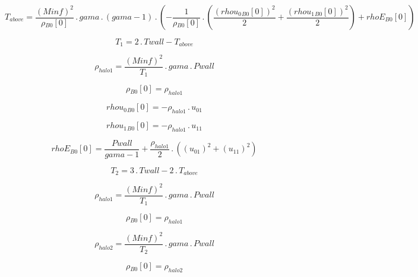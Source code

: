 \documentclass{article}
\begin{document}
\begin{dmath}T_{above} = \frac{\left(Minf \right)^{2}}{{\rho{_{B0}}}[{0}]} \,.\, gama \,.\, \left(gama - 1\right) \,.\, \left(- \frac{1}{{\rho{_{B0}}}[{0}]} \,.\, \left(\frac{\left({rhou_{0}{_{B0}}}[{0}] \right)^{2}}{2} + 
\frac{\left({rhou_{1}{_{B0}}}[{0}] \right)^{2}}{2}\right) + {rhoE{_{B0}}}[{0}]\right)\end{dmath}

\begin{dmath}T_{1} = 2 \,.\, Twall - T_{above}\end{dmath}

\begin{dmath}\rho_{halo 1} = \frac{\left(Minf \right)^{2}}{T_{1}} \,.\, gama \,.\, Pwall\end{dmath}

\begin{dmath}{\rho{_{B0}}}[{0}] = \rho_{halo 1}\end{dmath}

\begin{dmath}{rhou_{0}{_{B0}}}[{0}] = - \rho_{halo 1} \,.\, u_{01}\end{dmath}

\begin{dmath}{rhou_{1}{_{B0}}}[{0}] = - \rho_{halo 1} \,.\, u_{11}\end{dmath}

\begin{dmath}{rhoE{_{B0}}}[{0}] = \frac{Pwall}{gama - 1} + \frac{\rho_{halo 1}}{2} \,.\, \left(\left(u_{01} \right)^{2} + \left(u_{11} \right)^{2}\right)\end{dmath}

\begin{dmath}T_{2} = 3 \,.\, Twall - 2 \,.\, T_{above}\end{dmath}

\begin{dmath}\rho_{halo 1} = \frac{\left(Minf \right)^{2}}{T_{1}} \,.\, gama \,.\, Pwall\end{dmath}

\begin{dmath}{\rho{_{B0}}}[{0}] = \rho_{halo 1}\end{dmath}

\begin{dmath}\rho_{halo 2} = \frac{\left(Minf \right)^{2}}{T_{2}} \,.\, gama \,.\, Pwall\end{dmath}

\begin{dmath}{\rho{_{B0}}}[{0}] = \rho_{halo 2}\end{dmath}
\end{document}
